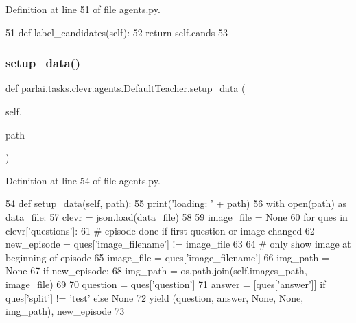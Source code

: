 Definition at line 51 of file agents.\+py.


\begin{DoxyCode}
51     \textcolor{keyword}{def }label\_candidates(self):
52         \textcolor{keywordflow}{return} self.cands
53 
\end{DoxyCode}
\mbox{\label{classparlai_1_1tasks_1_1clevr_1_1agents_1_1DefaultTeacher_ab0f3f8e22c6a0fe921f0cae4a20864f8}} 
\subsubsection{\texorpdfstring{setup\+\_\+data()}{setup\_data()}}
{\footnotesize\ttfamily def parlai.\+tasks.\+clevr.\+agents.\+Default\+Teacher.\+setup\+\_\+data (\begin{DoxyParamCaption}\item[{}]{self,  }\item[{}]{path }\end{DoxyParamCaption})}



Definition at line 54 of file agents.\+py.


\begin{DoxyCode}
54     \textcolor{keyword}{def }\hyperlink{namespaceparlai_1_1tasks_1_1multinli_1_1agents_a4fa2cb0ba1ed745336ad8bceed36b841}{setup\_data}(self, path):
55         print(\textcolor{stringliteral}{'loading: '} + path)
56         with open(path) \textcolor{keyword}{as} data\_file:
57             clevr = json.load(data\_file)
58 
59         image\_file = \textcolor{keywordtype}{None}
60         \textcolor{keywordflow}{for} ques \textcolor{keywordflow}{in} clevr[\textcolor{stringliteral}{'questions'}]:
61             \textcolor{comment}{# episode done if first question or image changed}
62             new\_episode = ques[\textcolor{stringliteral}{'image\_filename'}] != image\_file
63 
64             \textcolor{comment}{# only show image at beginning of episode}
65             image\_file = ques[\textcolor{stringliteral}{'image\_filename'}]
66             img\_path = \textcolor{keywordtype}{None}
67             \textcolor{keywordflow}{if} new\_episode:
68                 img\_path = os.path.join(self.images\_path, image\_file)
69 
70             question = ques[\textcolor{stringliteral}{'question'}]
71             answer = [ques[\textcolor{stringliteral}{'answer'}]] \textcolor{keywordflow}{if} ques[\textcolor{stringliteral}{'split'}] != \textcolor{stringliteral}{'test'} \textcolor{keywordflow}{else} \textcolor{keywordtype}{None}
72             \textcolor{keywordflow}{yield} (question, answer, \textcolor{keywordtype}{None}, \textcolor{keywordtype}{None}, img\_path), new\_episode
73 \end{DoxyCode}


